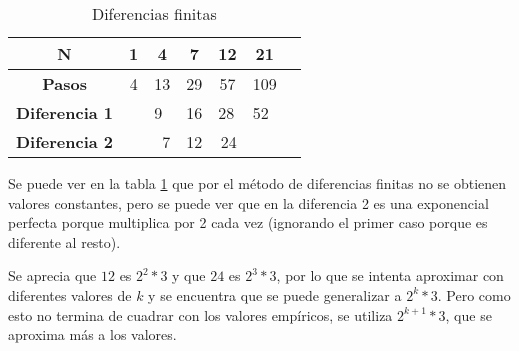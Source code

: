 \documentclass{uc3mpracticas}
\begin{document}
\begin{table}[!h]
  \centering
\begin{tabular}{|c|p{1cm}|p{1cm}|p{1cm}|p{1cm}|p{1cm}|p{1cm}|}
\hline
\textbf{N}     & \multicolumn{1}{c|}{\textbf{1}} & \multicolumn{1}{c|}{\textbf{4}} & \multicolumn{1}{c|}{\textbf{7}} & \multicolumn{1}{c|}{\textbf{12}} & \multicolumn{1}{c|}{\textbf{21}} \\ \hline
\textbf{Pasos} & \multicolumn{1}{c|}{4}          & \multicolumn{1}{c|}{13}          & \multicolumn{1}{c|}{29}         & \multicolumn{1}{c|}{57}         & \multicolumn{1}{c|}{109} \\ \hline
\textbf{Diferencia 1}                  &                                                         & 9                                                       & 16                               & 28                              &   52                           \\ \hline
\textbf{Diferencia 2}                  &                                                         & \multicolumn{1}{r|}{7}                                  & \multicolumn{1}{r|}{12}          & \multicolumn{1}{r|}{24}       &                         \\ \hline
\end{tabular}
\caption{Diferencias finitas}
\label{tab:difUlt}
\end{table}


Se puede ver en la tabla \ref{tab:difUlt} que por el método de diferencias finitas no se obtienen valores constantes, pero se puede ver que en la diferencia 2 es una exponencial perfecta porque multiplica por 2 cada vez (ignorando el primer caso porque es diferente al resto).

\vspace{2mm}

Se aprecia que $12$ es $ 2^2 *3$ y que $24$ es $2^3 * 3$, por lo que se intenta aproximar con diferentes valores de $k$ y se encuentra que se puede generalizar a $2^k * 3$. Pero como esto no termina de cuadrar con los valores empíricos, se utiliza $2^{k+1} * 3$, que se aproxima más a los valores.
\end{document}
